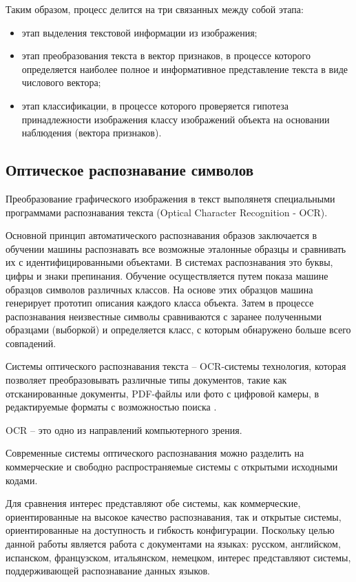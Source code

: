 Таким образом, процесс делится на три связанных между собой этапа:

\begin{itemize}
\item этап выделения текстовой информации из изображения;
\item этап преобразования текста в вектор признаков, в процессе которого определяется наиболее полное и информативное представление текста в виде числового вектора;
\item этап классификации, в процессе которого проверяется гипотеза принадлежности изображения классу изображений объекта на основании наблюдения (вектора признаков).
\end{itemize}

\subsection{Оптическое распознавание символов}

Преобразование графического изображения в текст выполянетя специальными программами распознавания текста (Optical Character Recognition - OCR).

Основной принцип автоматического распознавания образов заключается в обучении машины распознавать все возможные эталонные образцы и сравнивать их с идентифицированными объектами. В системах распознавания это буквы, цифры и знаки препинания. Обучение осуществляется путем показа машине образцов символов различных классов. На основе этих образцов машина генерирует прототип описания каждого класса объекта. Затем в процессе распознавания неизвестные символы сравниваются с заранее полученными образцами (выборкой) и определяется класс, с которым обнаружено больше всего совпадений.

Системы оптического распознавания текста -- OCR-системы технология, которая позволяет преобразовывать различные типы документов, такие как отсканированные документы, PDF-файлы или фото с цифровой камеры, в редактируемые форматы с возможностью поиска \cite{ocr}. 

OCR -- это одно из направлений компьютерного зрения. 

Современные системы оптического распознавания можно разделить на коммерческие и свободно распространяемые системы с открытыми исходными кодами.

Для сравнения интерес представляют обе системы, как коммерческие, ориентированные на высокое качество распознавания, так и открытые системы, ориентированные на доступность и гибкость конфигурации. Поскольку целью данной работы является работа с документами на языках: русском, английском, испанском, французском, итальянском, немецком, интерес представляют системы, поддерживающей распознавание данных языков.

